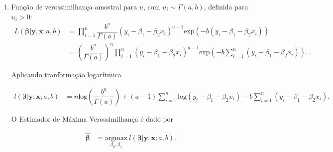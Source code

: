 \documentclass{homework}\usepackage[]{graphicx}\usepackage[]{color}
\begin{document}
\begin{enumerate}
  Obtendo a log-verossimilhança:
  
  \begin{align}
    l(\bm{\beta}|\mathbf{y}, \mathbf{x}; \mu_1, \mu_2, \sigma_1^2, \sigma_2^2) &= -n\mathrm{log}(2)+\sum^n_{i=1}\mathrm{log}\left(\dfrac{1}{\sqrt{2\pi\sigma_1^2}}\mathrm{exp}\left(-\dfrac{1}{2\sigma_1^2}\left(y_i - \beta_0 - \beta_1 x_i - \mu_1 \right)^2\right) +\right\\
    &\left\dfrac{1}{\sqrt{2\pi\sigma_2^2}}\mathrm{exp}\left(-\dfrac{1}{2\sigma_2^2}\left(y_i - \beta_0 - \beta_1 x_i - \mu_2 \right)^2\right)\right)\nonumber.
  \end{align}
  
  O Estimador de Máxima Verossimilhança é dado por
  
  \begin{align}
    \hat{\bm{\beta}} &= \underset{\beta_0, \beta_1}{\mathrm{argmax}}\ l(\bm{\beta}|\mathbf{y}, \mathbf{x}; \mu_1, \mu_2, \sigma_1^2, \sigma_2^2).
  \end{align}
  
  \item Função de verossimilhança amostral para $u$, com $u_i \sim \Gamma(a,b)$, definida para $u_i > 0$:
  \begin{align}
  L(\bm{\beta}|\mathbf{y}, \mathbf{x}; a, b) &= \prod_{i=1}^n{\dfrac{b^a}{\Gamma(a)}\left(y_i - \beta_1 - \beta_2 x_i\right)^{a-1}\mathrm{exp}\left(-b\left(y_i - \beta_1 - \beta_2 x_i\right)\right)}\\
  &= \left(\dfrac{b^a}{\Gamma(a)}\right)^n\prod_{i=1}^n{\left(y_i - \beta_1 - \beta_2 x_i\right)^{a-1}}\mathrm{exp}\left(-b\sum_{i=1}^n\left(y_i - \beta_1 - \beta_2 x_i\right)\right).\nonumber
  \end{align}
  
  Aplicando tranformação logarítmica
  
  \begin{align}
  l(\bm{\beta}|\mathbf{y}, \mathbf{x}; a, b) &= n\mathrm{log}\left(\dfrac{b^a}{\Gamma(a)}\right) + (a-1)\sum_{i=1}^n{\mathrm{log}\left(y_i - \beta_1 - \beta_2 x_i\right)} -b\sum_{i=1}^n\left(y_i - \beta_1 - \beta_2 x_i\right).
  \end{align}
  
  O Estimador de Máxima Verossimilhança é dado por
  
  \begin{align}
    \hat{\bm{\beta}} &= \underset{\beta_0, \beta_1}{\mathrm{argmax}}\ l(\bm{\beta}|\mathbf{y}, \mathbf{x}; a, b).
  \end{align}
  

\end{enumerate}
\end{document}
